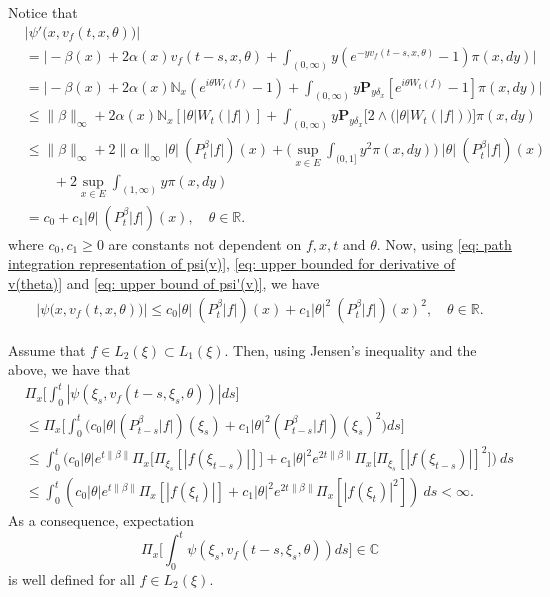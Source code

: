 \documentclass[12pt, a4paper]{amsart}
\theoremstyle{definition}
\numberwithin{equation}{section}
\begin{document}
    Notice that
\begin{align}
\label{eq: upper bound of psi'(v)}
    &\big|\psi'\big(x, v_f(t,x,\theta)\big)\big| 
    \\&= \Big| -\beta(x)+ 2\alpha(x) v_f(t-s,x,\theta) 
    + \int_{(0,\infty)} y (e^{-y v_f(t-s,x,\theta)} - 1) \pi(x,dy)\Big|
    \\&= \Big| - \beta(x)+ 2\alpha(x)\mathbb N_x(e^{i\theta W_{t}(f)} - 1)  + \int_{(0,\infty)} y \mathbf P_{y \delta_x}[e^{i\theta W_{t}(f)} - 1] \pi(x,dy) \Big|
\\ &\leq \|\beta\|_\infty + 2\alpha(x)\mathbb N_x[|\theta| W_t(|f|)]+ \int_{(0,\infty)} y\mathbf P_{y\delta_x}\big[2\wedge\big(|\theta| W_t(|f|)\big)\big] \pi(x,dy)
\\ &\leq \|\beta\|_\infty + 2\|\alpha\|_\infty  |\theta|~ (P^\beta_t |f|)(x) + \Big(\sup_{x\in E}\int_{(0,1]}y^2 \pi(x,dy)\Big)~ |\theta| ~(P^\beta_t |f|)(x) 
\\ & \qquad + 2\sup_{x\in E}\int_{(1,\infty)} y \pi(x,dy)
\\ &= c_0 +c_1 |\theta| ~(P^\beta_t |f|)(x),
\quad \theta \in \mathbb R.
\end{align}
    where $c_0,c_1 \geq 0$ are constants not dependent on $f,x,t$ and $\theta$.
    Now, using \eqref{eq: path integration representation of psi(v)}, \eqref{eq: upper bounded for derivative of v(theta)} and \eqref{eq: upper bound of psi'(v)}, we have
\begin{align}
\label{eq: upper bound of psi(v)}
    \big|\psi\big(x,v_f(t,x,\theta)\big)\big| 
    \leq c_0|\theta|~(P^\beta_t |f|)(x)+c_1 |\theta|^2 ~(P^\beta_t |f|)(x)^2,
    \quad \theta \in \mathbb R.
\end{align}

    Assume that $f \in L_2(\xi) \subset L_1(\xi)$.
    Then, using Jensen's inequality and the above, we have that 
\begin{align}
\label{eq: domination of psi(v)}
    &\Pi_x\Big[\int_0^t |\psi(\xi_s,v_f(t-s,\xi_s,\theta))|ds\Big] 
\\&\leq \Pi_x\Big[\int_0^t \big(c_0|\theta| (P_{t-s}^\beta|f|)(\xi_s)+c_1|\theta|^2(P_{t-s}^\beta|f|)(\xi_s)^2\big)ds\Big]
\\ &\leq \int_0^t \big(c_0|\theta|e^{t\|\beta\|}\Pi_x \big[ \Pi_{\xi_s}[|f(\xi_{t-s})|] \big]+c_1|\theta|^2e^{2t\|\beta\|}\Pi_x \big[ \Pi_{\xi_s}[|f (\xi_{t-s})|]^2 \big]\big)~ds
\\ &\leq \int_0^t (c_0|\theta|e^{t\|\beta\|}\Pi_x [ |f(\xi_{t})|]+c_1|\theta|^2e^{2t\|\beta\|}\Pi_x [ |f (\xi_{t})|^2 ])~ds < \infty.
\end{align}
    As a consequence, expectation
\[
    \Pi_x\Big[\int_0^t \psi(\xi_s,v_f(t-s,\xi_s,\theta))ds\Big]
    \in \mathbb C
\]
    is well defined for all $f\in L_2(\xi)$.
\end{document}
